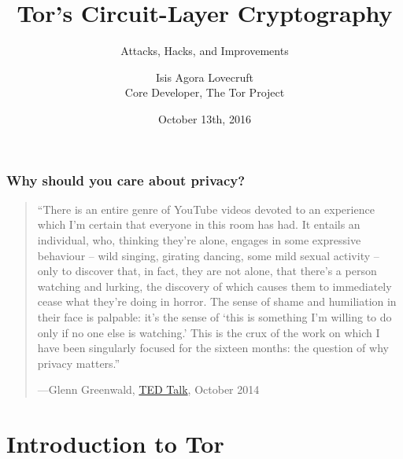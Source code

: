 \documentclass[9pt,a4paper,handout]{beamer}
\title{Tor's Circuit-Layer Cryptography}
\subtitle{Attacks, Hacks, and Improvements}
\author{Isis Agora Lovecruft \\
  Core Developer, The Tor Project
}
\date{\vspace{3mm} October 13th, 2016}
\institute{University of Waterloo}
\begin{document}
\maketitle


\begin{frame}
  \frametitle{Why should you care about privacy?}
  \begin{quotation}
    ``There is an entire genre of YouTube videos devoted to an experience which
    I'm certain that everyone in this room has had. It entails an individual,
    who, thinking they're alone, engages in some expressive behaviour -- wild
    singing, girating dancing, some mild sexual activity -- only to discover
    that, in fact, they are not alone, that there's a person watching and
    lurking, the discovery of which causes them to immediately cease what
    they're doing in horror. The sense of shame and humiliation in their face is
    palpable: it's the sense of `this is something I'm willing to do only if no
    one else is watching.'  This is the crux of the work on which I have been
    singularly focused for the sixteen months: the question of why privacy matters.'' \\
    \hfill{\raggedright---Glenn Greenwald,
      \href{https://www.youtube.com/watch?v=pcSlowAhvUk}{TED Talk}, October 2014}
  \end{quotation}
\end{frame}


\section{Introduction to Tor}
\end{document}
